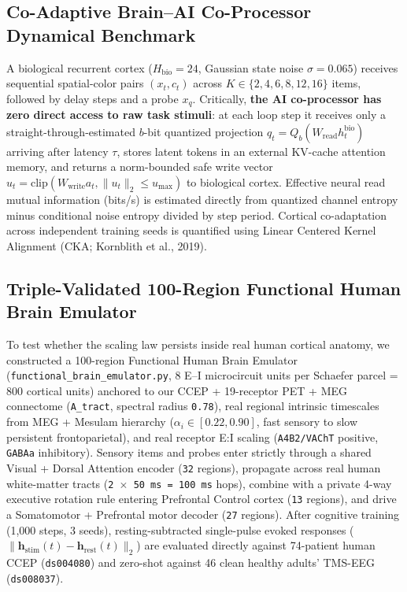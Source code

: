 \documentclass[11pt,a4paper]{article}
\begin{document}
\subsection{Co-Adaptive Brain--AI Co-Processor Dynamical Benchmark}
A biological recurrent cortex ($H_{\text{bio}} = 24$, Gaussian state noise $\sigma = 0.065$) receives sequential spatial-color pairs $(x_t, c_t)$ across $K \in \{2, 4, 6, 8, 12, 16\}$ items, followed by delay steps and a probe $x_q$. Critically, \textbf{the AI co-processor has zero direct access to raw task stimuli}: at each loop step it receives only a straight-through-estimated $b$-bit quantized projection $q_t = Q_b(W_{\text{read}} h_t^{\text{bio}})$ arriving after latency $\tau$, stores latent tokens in an external KV-cache attention memory, and returns a norm-bounded safe write vector $u_t = \text{clip}(W_{\text{write}} a_t, \|u_t\|_2 \le u_{\max})$ to biological cortex. Effective neural read mutual information (bits/s) is estimated directly from quantized channel entropy minus conditional noise entropy divided by step period. Cortical co-adaptation across independent training seeds is quantified using Linear Centered Kernel Alignment (CKA; Kornblith et al., 2019).

\subsection{Triple-Validated 100-Region Functional Human Brain Emulator}
To test whether the scaling law persists inside real human cortical anatomy, we constructed a 100-region Functional Human Brain Emulator (\texttt{functional\_brain\_emulator.py}, 8 E--I microcircuit units per Schaefer parcel = 800 cortical units) anchored to our CCEP + 19-receptor PET + MEG connectome (\texttt{A\_tract}, spectral radius \texttt{0.78}), real regional intrinsic timescales from MEG + Mesulam hierarchy ($\alpha_i \in [0.22, 0.90]$, fast sensory to slow persistent frontoparietal), and real receptor E:I scaling (\texttt{A4B2/VAChT} positive, \texttt{GABAa} inhibitory). Sensory items and probes enter strictly through a shared Visual + Dorsal Attention encoder (\texttt{32} regions), propagate across real human white-matter tracts (\texttt{2 $\times$ 50 ms = 100 ms} hops), combine with a private 4-way executive rotation rule entering Prefrontal Control cortex (\texttt{13} regions), and drive a Somatomotor + Prefrontal motor decoder (\texttt{27} regions). After cognitive training (1,000 steps, 3 seeds), resting-subtracted single-pulse evoked responses ($\|\mathbf{h}_{\text{stim}}(t) - \mathbf{h}_{\text{rest}}(t)\|_2$) are evaluated directly against 74-patient human CCEP (\texttt{ds004080}) and zero-shot against 46 clean healthy adults' TMS-EEG (\texttt{ds008037}).
\end{document}
